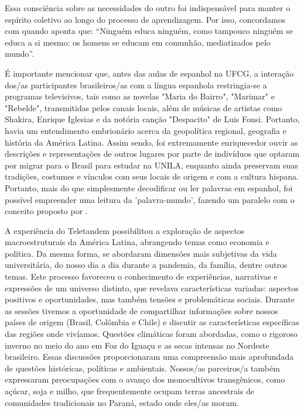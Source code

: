 \documentclass[portuguese]{textolivre}
\begin{document}
Essa consciência sobre as necessidades do outro foi indispensável para manter o espírito coletivo ao longo do processo de aprendizagem. Por isso, concordamos com \textcite[p.9]{freire_pedagogia_1981} quando aponta que: “Ninguém educa ninguém, como tampouco ninguém se educa a si mesmo: os homens se educam em comunhão, mediatizados pelo mundo”. 

É importante mencionar que, antes das aulas de espanhol na UFCG, a interação dos/as participantes brasileiros/as com a língua espanhola restringia-se a programas televisivos, tais como as novelas "Maria do Bairro", "Marimar" e "Rebelde", transmitidas pelos canais locais, além de músicas de artistas como Shakira, Enrique Iglesias e da notória canção "Despacito" de Luis Fonsi. Portanto, havia um entendimento embrionário acerca da geopolítica regional, geografia e história da América Latina. Assim sendo, foi extremamente enriquecedor ouvir as descrições e representações de outros lugares por parte de indivíduos que optaram por migrar para o Brasil para estudar na UNILA, enquanto ainda preservam suas tradições, costumes e vínculos com seus locais de origem e com a cultura hispana. Portanto, mais do que simplesmente decodificar ou ler palavras em espanhol, foi possível empreender uma leitura da 'palavra-mundo', fazendo um paralelo com o conceito proposto por \textcite{freire_importancia_1991} . 

A experiência do Teletandem possibilitou a exploração de aspectos macroestruturais da América Latina, abrangendo temas como economia e política. Da mesma forma, se abordaram dimensões mais subjetivas da vida universitária, do nosso dia a dia durante a pandemia, da família, dentre outros temas. Este processo favoreceu o conhecimento de experiências, narrativas e expressões de um universo distinto, que revelava características variadas: aspectos positivos e oportunidades, mas também tensões e problemáticas sociais. Durante as sessões tivemos a oportunidade de compartilhar informações sobre nossos países de origem (Brasil, Colômbia e Chile) e discutir as características específicas das regiões onde vivíamos. Questões climáticas foram abordadas, como o rigoroso inverno no meio do ano em Foz do Iguaçu e as secas intensas no Nordeste brasileiro. Essas discussões proporcionaram uma compreensão mais aprofundada de questões históricas, políticas e ambientais. Nossos/as parceiros/a também expressaram preocupações com o avanço dos monocultivos transgênicos, como açúcar, soja e milho, que frequentemente ocupam terras ancestrais de comunidades tradicionais no Paraná, estado onde eles/as moram. 
\end{document}
